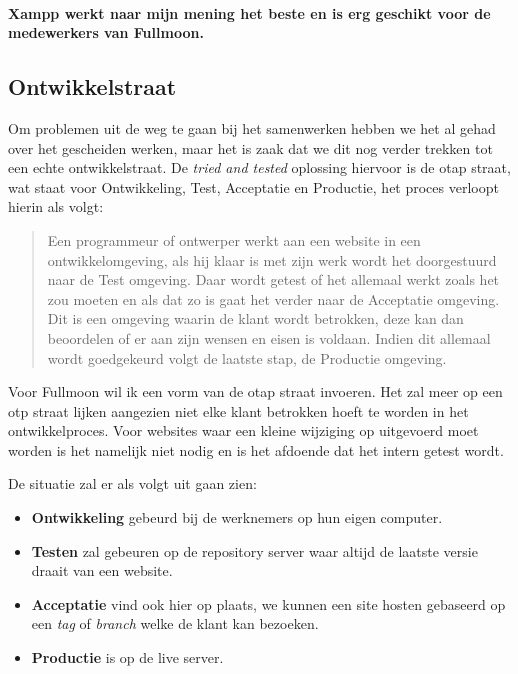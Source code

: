 \documentclass[12pt,a4paper]{article}
\begin{document}
    \paragraph{Xampp werkt naar mijn mening het beste en is erg geschikt voor de medewerkers van Fullmoon.}
    
    \subsection{Ontwikkelstraat}
    
    Om problemen uit de weg te gaan bij het samenwerken hebben we het al gehad over het gescheiden werken, maar het is zaak dat we dit nog verder trekken tot een echte ontwikkelstraat. De \emph{tried and tested} oplossing hiervoor is de {\sc otap} straat, wat staat voor Ontwikkeling, Test, Acceptatie en Productie, het proces verloopt hierin als volgt:
    
    \begin{quote}
      Een programmeur of ontwerper werkt aan een website in een ontwikkelomgeving, als hij klaar is met zijn werk wordt het doorgestuurd naar de Test omgeving. Daar wordt getest of het allemaal werkt zoals het zou moeten en als dat zo is gaat het verder naar de Acceptatie omgeving. Dit is een omgeving waarin de klant wordt betrokken, deze kan dan beoordelen of er aan zijn wensen en eisen is voldaan. Indien dit allemaal wordt goedgekeurd volgt de laatste stap, de Productie omgeving.
    \end{quote}
    
    Voor Fullmoon wil ik een vorm van de {\sc otap} straat invoeren. Het zal meer op een {\sc otp} straat lijken aangezien niet elke klant betrokken hoeft te worden in het ontwikkelproces. Voor websites waar een kleine wijziging op uitgevoerd moet worden is het namelijk niet nodig en is het afdoende dat het intern getest wordt.
    
    De situatie zal er als volgt uit gaan zien:
    
    \begin{itemize}
      \item \textbf{Ontwikkeling} gebeurd bij de werknemers op hun eigen computer.
      \item \textbf{Testen} zal gebeuren op de repository server waar altijd de laatste versie draait van een website.
      \item \textbf{Acceptatie} vind ook hier op plaats, we kunnen een site hosten gebaseerd op een \emph{tag} of \emph{branch} welke de klant kan bezoeken.
      \item \textbf{Productie} is op de live server.
    \end{itemize}
    
\end{document}
